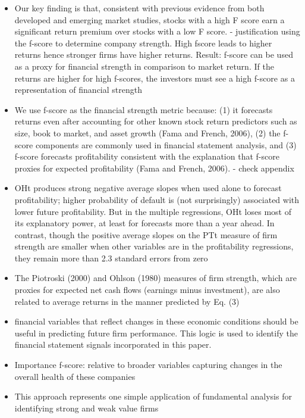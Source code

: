 \documentclass[12pt]{article}
\begin{document}
        \begin{itemize}

            \item Our key finding is that, consistent with previous evidence from both developed and emerging market studies, stocks with a high F score earn a significant return premium over stocks with a low F score. \citep{Hyde2014} - justification using the f-score to determine company strength. High fscore leads to higher returns hence stronger firms have higher returns. Result: f-score can be used as a proxy for financial strength in comparison to market return. If the returns are higher for high f-scores, the investors must see a high f-score as a representation of financial strength

            \item We use f-score as the financial strength metric because: (1) it forecasts returns even after accounting for other known stock return predictors such as size, book to market, and asset growth (Fama and French, 2006), (2) the f-score components are commonly used in financial statement analysis, and (3) f-score forecasts profitability consistent with the explanation that f-score proxies for expected profitability (Fama and French, 2006).\citep{Choi2012} - check appendix 

            \item OHt produces strong negative average slopes when used alone to forecast profitability; higher probability of default is (not surprisingly) associated with lower future profitability. But in the multiple regressions, OHt loses most of its explanatory power, at least for forecasts more than a year ahead. In contrast, though the
            positive average slopes on the PTt measure of firm strength are smaller when other variables are in the profitability regressions, they remain more than 2.3 standard errors
            from zero \citep{Fama2006}

            \item The Piotroski (2000) and Ohlson (1980) measures of firm strength, which are proxies for expected net cash flows (earnings minus investment), are also related to average returns in the manner predicted by Eq. (3) \citep{Fama2006}

            \item financial variables that reflect changes in these economic conditions should be useful in predicting future firm performance. This logic is used to identify the financial statement signals incorporated in this paper. \citep{Piotroski2000}

            \item Importance f-score: relative to broader variables capturing changes in the overall health of these companies \citep{Piotroski2000}

            \item This approach represents one simple application of fundamental analysis for identifying strong and weak value firms \citep{Piotroski2000}

        \end{itemize}
\end{document}
